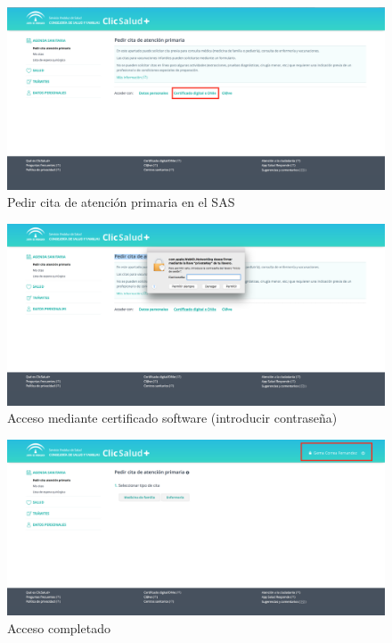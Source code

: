 \documentclass{manual}
\begin{document}
\begin{figure}[H]
	\centering
	\includegraphics[width=140mm]{images/cita}
	\caption{Pedir cita de atención primaria en el SAS} 
	\label{cita}
\end{figure}

\begin{figure}[H]
	\centering
	\includegraphics[width=140mm]{images/cita1}
	\caption{Acceso mediante certificado software (introducir contraseña)} 
\end{figure}

\begin{figure}[H]
	\centering
	\includegraphics[width=140mm]{images/cita2}
	\caption{Acceso completado} 
\end{figure}
\end{document}
